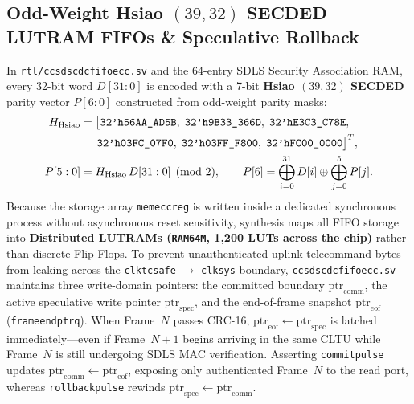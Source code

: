 \documentclass[10pt,a4paper]{article}
\renewcommand{\_}{\origunderscore\penalty0\hskip0pt\relax}
\numberwithin{equation}{section}
\numberwithin{table}{section}
\numberwithin{figure}{section}
\begin{document}
\subsection{Odd-Weight Hsiao $(39,32)$ SECDED LUTRAM FIFOs \& Speculative Rollback}
In \texttt{rtl/ccsds\_cdc\_fifo\_ecc.sv} and the 64-entry SDLS Security Association RAM, every 32-bit word $D[31:0]$ is encoded with a 7-bit \textbf{Hsiao $(39,32)$ SECDED} parity vector $P[6:0]$ constructed from odd-weight parity masks:
\begin{equation}
\begin{aligned}
  H_{\text{Hsiao}} &= \big[\texttt{32'h56AA\_AD5B},\; \texttt{32'h9B33\_366D},\; \texttt{32'hE3C3\_C78E}, \\
                   &\phantom{=\big[}\texttt{32'h03FC\_07F0},\; \texttt{32'h03FF\_F800},\; \texttt{32'hFC00\_0000}\big]^T, \\
  P[5:0] &= H_{\text{Hsiao}}\,D[31:0] \pmod 2, \qquad P[6] = \bigoplus_{i=0}^{31} D[i] \oplus \bigoplus_{j=0}^{5} P[j].
\end{aligned}
\end{equation}
Because the storage array \texttt{mem\_ecc\_reg} is written inside a dedicated synchronous process without asynchronous reset sensitivity, synthesis maps all FIFO storage into \textbf{Distributed LUTRAMs (\texttt{RAM64M}, 1,200 LUTs across the chip)} rather than discrete Flip-Flops. To prevent unauthenticated uplink telecommand bytes from leaking across the \texttt{clk\_tc\_safe} $\to$ \texttt{clk\_sys} boundary, \texttt{ccsds\_cdc\_fifo\_ecc.sv} maintains three write-domain pointers: the committed boundary $\text{ptr}_{\text{comm}}$, the active speculative write pointer $\text{ptr}_{\text{spec}}$, and the end-of-frame snapshot $\text{ptr}_{\text{eof}}$ (\texttt{frame\_end\_ptr\_q}). When Frame~$N$ passes CRC-16, $\text{ptr}_{\text{eof}} \leftarrow \text{ptr}_{\text{spec}}$ is latched immediately—even if Frame~$N+1$ begins arriving in the same CLTU while Frame~$N$ is still undergoing SDLS MAC verification. Asserting \texttt{commit\_pulse} updates $\text{ptr}_{\text{comm}} \leftarrow \text{ptr}_{\text{eof}}$, exposing only authenticated Frame~$N$ to the read port, whereas \texttt{rollback\_pulse} rewinds $\text{ptr}_{\text{spec}} \leftarrow \text{ptr}_{\text{comm}}$.

\vspace{6pt}
\end{document}
